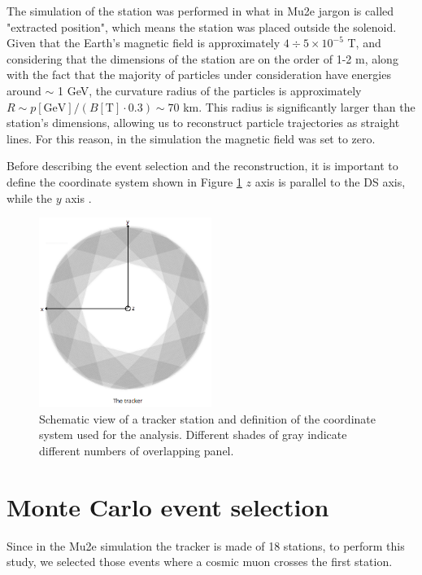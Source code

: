 The simulation of the station was performed in what in Mu2e jargon is called
"extracted position", which means the station was placed outside the solenoid.
Given that the Earth's magnetic field is approximately 
$4 \div 5 \times 10^{-5}$ T, 
and considering that the dimensions of the station are 
on the order of 1-2 m, 
along with the fact that the majority of particles under consideration
have energies around $\sim$ 1 GeV, 
the curvature radius of the particles is approximately 
$R\sim p[\text{GeV}]/(B[\text{T}]\cdot 0.3) \sim 70$ km. 
This radius is significantly larger than the station's 
dimensions, allowing us to reconstruct particle trajectories 
as straight lines.
For this reason, in the simulation  
the magnetic field was set to zero. 

Before describing the event selection and the 
reconstruction, it is important to define the coordinate system shown in Figure \ref{fig:coordinate}
 $z$ axis is parallel to 
the DS axis, while the $y$ axis .
\begin{figure}[!h]
    \centering
    \includegraphics[width =0.5\textwidth]{figures/png/Screenshot_20240526_164527.png}
    \caption[Schematic view of a tracker station and 
    the coordinate system.]{Schematic view of a tracker station 
    and definition of the coordinate system used for the analysis. 
    Different shades of gray indicate different numbers of overlapping panel.}
    \label{fig:coordinate}
\end{figure}
\section{Monte Carlo event selection}\label{eventselection}

Since in the Mu2e simulation the tracker is made of 18 stations, to 
perform this study, we selected those events where a 
cosmic muon crosses the first station.


